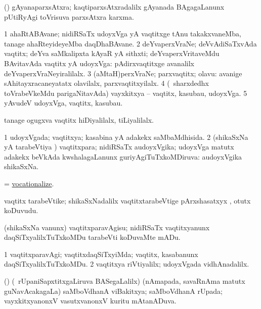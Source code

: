\bentry
{}
\gl{\nA}
\expl{}
\bmng
 (\saM) gAyanaparxsAtxra; kaqtiparxsAtxradalilx gAyanada BAgagaLanunx pUtiRyAgi toVrisuva parxsAtxra karxma. 
\emng
\eentry

\bentry
{} 
\gl{\nA}
\expl{}
\bmng
\bnum
\num{1} ahaRtABAvane; nidiRSaTx udoyxVga yA vaqtitxge tAnu takakxvaneMba, tanage ahaRteyideyeMba daqDhaBAvane. 
\num{2} deYvaperxVraNe; deVvAdiSaTxvAda vaqtitx; deYva saMkalipxta kAyaR yA sithxti; deYvaperxVritaveMdu BAvitavAda vaqtitx yA udoyxVga:  pAdirxvaqtitxge avanalilx deYvaperxVraNeyiralilalx. 
\num{3} (aMtaH)perxVraNe; parxvaqtitx; olavu:  avanige sAhitayxracaneyatatx olavilalx, parxvaqtitxyilalx. 
\num{4} (\kanmu\ sharxdedhx toVrabeVkeMdu parigaNitavAda) vayxkitxya -- vaqtitx, kasubau, udoyxVga. 
\num{5} yAvudeV udoyxVga, vaqtitx, kasubau. 
\enum
\emng

\noindent 
\gl{\pagu}
\expl{}
\bmng
  tanage ogugxva vaqtitx hiDiyalilalx, tiLiyalilalx. 
\emng
\eentry

\bentry 
{} 
\gl{\gu}
\expl{}
\bmng
\bnum
\num{1} udoyxVgada; vaqtitxya; kasabina yA adakekx saMbaMdhisida. 
\num{2} (shikaSxNa yA tarabeVtiya \vi) vaqtitxpara; nidiRSaTx audoyxVgika; udoyxVga matutx adakekx beVkAda kwshalagaLanunx guriyAgiTuTxkoMDiruva:  audoyxVgika shikaSxNa. 
\enum
\emng
\eentry

\bentry
{} 
\gl{\sakirx}
\expl{}
\bmng
 = \hyperlink{vocationalize}{vocationalize}. 
\emng
\eentry

\bentry 
{} 
\gl{\nA}
\expl{}
\bmng
 vaqtitx tarabeVtike; shikaSxNadalilx vaqtitxtarabeVtige pArxshasatxyx , otutx koDuvudu. 
\emng
\eentry

\bentry
{} 
\gl{\sakirx}
\expl{}
\bmng
 (shikaSxNa \mo vanunx) vaqtitxparavAgisu; nidiRSaTx vaqtitxyanunx daqSiTxyalilxTuTxkoMDu tarabeVti koDuvaMte mADu. 
\emng
\eentry

\bentry
{} 
\gl{\kirxvi}
\expl{}
\bmng
\bnum
\num{1} vaqtitxparavAgi; vaqtitxdaqSiTxyiMda; vaqtitx, kasabanunx daqSiTxyalilxTuTxkoMDu. 
\num{2} vaqtitxya riVtiyalilx; udoyxVgada vidhAnadalilx. 
\enum
\emng
\eentry

\bentry
{} 
\gl{\gu}
\expl{}
\bmng
 (\vAyx) (\kanmu\ rUpaniSapxtitxgaLiruva BASegaLalilx) (nAmapada, savaRnAma matutx guNavAcakagaLa) saMboVdhanA viBakitxya; saMboVdhanA rUpada; vayxkitxyanonxV vasutxvanonxV kuritu mAtanADuva. 
\emng
\eentry


